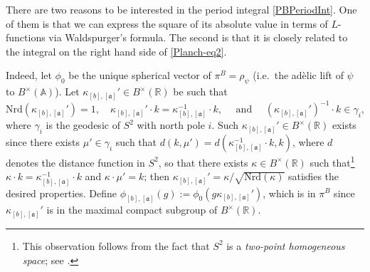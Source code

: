 \documentclass[11pt]{amsart}
\newcommand{\R}{\mathbb{R}}
\newcommand{\A}{\mathbb{A}}
\renewcommand{\a}{\mathfrak{a}}
\newcommand{\nrd}[1]{\mathrm{Nrd}\left(#1\right)}
\theoremstyle{definition}
\theoremstyle{remark}
\begin{document}
There are two reasons to be interested in the period integral \eqref{PBPeriodInt}. One of them is that we can express the square of its absolute value in terms of $L$-functions via Waldspurger's formula. The second is that it is closely related to the integral on the right hand side of \eqref{Planch-eq2}. 

Indeed, let $\phi_0$ be the unique spherical vector of $\pi^B = \rho_{\psi}$ (i.e.~the adèlic lift of $\psi$ to $B^{\times}(\A)$). Let $\kappa_{[b],[\a]}'\in B^{\times}(\R)$ be such that $$\nrd{\kappa_{[b],[\a]}'} = 1, \quad \kappa_{[b],[\a]}'\cdot k = \kappa_{[b],[\a]}^{-1}\cdot k, \quad \text{ and } \quad (\kappa_{[b],[\a]}')^{-1} \cdot k \in \gamma_i,$$ where $\gamma_i$ is the geodesic of $S^2$ with north pole $i$. Such $\kappa_{[b],[\a]}' \in B^{\times}(\R)$ exists since there exists $\mu' \in \gamma_i$ such that $d(k,\mu') = d(\kappa_{[b],[\a]}^{-1} \cdot k,k)$, where $d$ denotes the distance function in $S^2$, so that there exists $\kappa \in B^{\times}(\R)$ such that\footnote{This observation follows from the fact that $S^2$ is a \textit{two-point homogeneous space}; see \cite[\S 5.2, Thm. II]{TwoPointHomSpaces}.} $\kappa \cdot k = \kappa_{[b],[\a]}^{-1}\cdot k$ and $\kappa \cdot \mu' = k$; then $\kappa_{[b],[\a]}' = \kappa / \sqrt{\nrd{\kappa}}$ satisfies the desired properties. Define $\phi_{[b], [\a]}(g) := \phi_0\left( g\kappa_{[b], [\a]}' \right)$, which is in $\pi^{B}$ since $\kappa_{[b],[\a]}'$ is in the maximal compact subgroup of $B^{\times}(\R)$.
\end{document}
